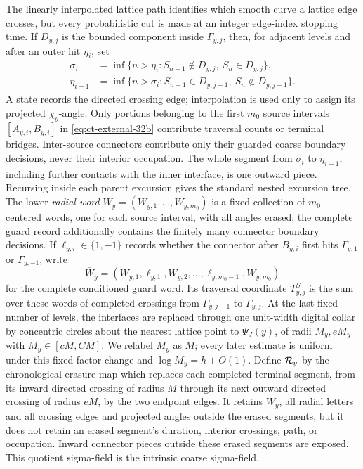 The linearly interpolated lattice path identifies which smooth curve a
lattice edge crosses, but every probabilistic cut is made at an integer
edge-index stopping time.  If $D_{y,j}$ is the bounded component inside
$\Gamma_{y,j}$, then, for adjacent levels and after an outer hit
$\eta_i$, set
\begin{equation}
\begin{aligned}
\sigma_i&=\inf\{n>\eta_i:S_{n-1}\notin D_{y,j},\ S_n\in D_{y,j}\},\\
\eta_{i+1}&=\inf\{n>\sigma_i:S_{n-1}\in D_{y,j-1},\
                                  S_n\notin D_{y,j-1}\}.
\end{aligned}\label{eq:ct-transfer-39h}
\end{equation}
A state records the directed crossing edge; interpolation is used only to
assign its projected $\chi_y$-angle.
Only portions belonging to the first $m_0$ source intervals
$[A_{y,i},B_{y,i}]$ in \eqref{eq:ct-external-32b} contribute traversal counts or terminal
bridges.  Inter-source connectors contribute only their guarded coarse
boundary decisions, never their interior occupation.  The whole segment
from $\sigma_i$ to $\eta_{i+1}$, including further contacts with the
inner interface, is one outward piece.  Recursing inside each parent
excursion gives the standard nested excursion tree.  The lower
\emph{radial word} $W_y=(W_{y,1},\ldots,W_{y,m_0})$ is a fixed collection
of $m_0$ centered words, one for each source interval, with all angles
erased; the complete guard record additionally contains the finitely many
connector boundary decisions.  If
$\ell_{y,i}\in\{1,-1\}$ records whether the connector after
$B_{y,i}$ first hits $\Gamma_{y,1}$ or $\Gamma_{y,-1}$, write
\begin{equation}
\overline W_y=(W_{y,1},\ell_{y,1},W_{y,2},\ldots,
                 \ell_{y,m_0-1},W_{y,m_0})\label{eq:ct-transfer-39hprime}
\end{equation}
for the complete conditioned guard word.  Its traversal coordinate
$T^S_{y,j}$ is the sum over these
words of completed crossings from $\Gamma_{y,j-1}$ to
$\Gamma_{y,j}$.  At the last
fixed number of levels, the interfaces are replaced through one
unit-width digital collar by concentric circles about the nearest lattice
point to $\Psi_J(y)$, of radii $M_y,eM_y$ with
$M_y\in[cM,CM]$.  We relabel $M_y$ as $M$; every later estimate is
uniform under this fixed-factor change and $\log M_y=h+O(1)$.
Define ${\cal R}_y$ by the chronological erasure map which replaces each
completed terminal segment, from its inward directed crossing of radius
$M$ through its next outward directed crossing of radius $eM$, by the
two endpoint edges.  It retains $\overline W_y$, all radial letters and
all crossing edges and projected angles outside the erased segments, but
it does not retain an erased segment's duration, interior crossings, path,
or occupation.  Inward connector pieces outside these erased segments are
exposed.  This quotient sigma-field is the intrinsic coarse sigma-field.

